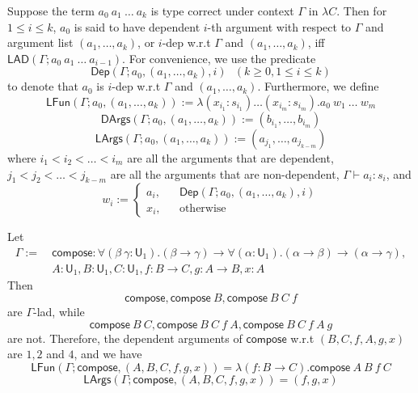 \begin{definition} Suppose the term $a_0 \ a_1 \ \dots \ a_k$ is type correct under
  context $\Gamma$ in $\lambda C$. Then for $1 \leq i \leq k$, $a_0$ is said to have dependent $i$-th argument
  with respect to $\Gamma$ and argument list $(a_1, \dots, a_k)$, or $i$-dep w.r.t
  $\Gamma$ and $(a_1, \dots, a_k)$, iff $\mathsf{LAD}(\Gamma; a_0 \ a_1 \ \dots \ a_{i - 1})$.
  For convenience, we use the predicate
  $$\mathsf{Dep}(\Gamma; a_0, (a_1, \dots, a_k), i) \ \ \ (k \geq 0, 1 \leq i \leq k)$$
  to denote that $a_0$ is $i$-dep w.r.t $\Gamma$ and $(a_1, \dots, a_k)$. Furthermore, we define
  $$\mathsf{LFun}(\Gamma; a_0, (a_1, \dots, a_k)) := \lambda (x_{i_1} : s_{i_1}) \dots (x_{i_m} : s_{i_m}). a_0 \ w_1 \ \dots \ w_m$$
  $$\mathsf{DArgs}(\Gamma; a_0, (a_1, \dots, a_k)) := (b_{i_1}, \dots, b_{i_m})$$
  $$\mathsf{LArgs}(\Gamma; a_0, (a_1, \dots, a_k)) := (a_{j_1}, \dots, a_{j_{k - m}})$$
  where $i_1 < i_2 < \dots < i_m$ are all the arguments that are dependent, $j_1 < j_2 < \dots < j_{k - m}$
  are all the arguments that are non-dependent, $\Gamma \vdash a_i : s_i$, and
  $$w_i := \left\{\begin{aligned}
    a_i, & & \mathsf{Dep}(\Gamma; a_0, (a_1, \dots, a_k), i) \\
    x_i, & & \text{otherwise}
  \end{aligned}\right.$$
\end{definition}

\begin{example} Let
  \begin{align*}
    \Gamma := & \ \mathsf{compose} : \forall (\beta \ \gamma: \mathsf{U}_1).
      (\beta \to \gamma) \to \forall (\alpha : \mathsf{U}_1). (\alpha \to \beta) \to (\alpha \to \gamma), \\
      & \ A : \mathsf{U}_1, B : \mathsf{U}_1, C : \mathsf{U}_1, f : B \to C, g : A \to B, x : A
  \end{align*}
  Then
  $$\mathsf{compose}, \mathsf{compose} \ B, \mathsf{compose} \ B \ C \ f$$
  are $\Gamma$-lad, while
  $$\mathsf{compose} \ B \ C, \mathsf{compose} \ B \ C \ f \ A, \mathsf{compose} \ B \ C \ f \ A \ g$$
  are not. Therefore, the dependent arguments of $\mathsf{compose}$ w.r.t $(B, C, f, A, g, x)$
  are $1, 2$ and $4$, and we have
  $$\mathsf{LFun}(\Gamma; \mathsf{compose}, (A, B, C, f, g, x)) = \lambda (f : B \to C). \mathsf{compose} \ A \ B \ f \ C$$
  $$\mathsf{LArgs}(\Gamma; \mathsf{compose}, (A, B, C, f, g, x)) = (f, g, x)$$
\end{example}

